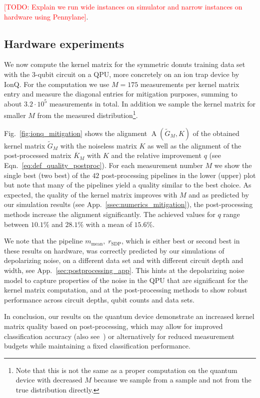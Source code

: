 \documentclass[twocolumn,superscriptaddress,nofootinbib]{revtex4-2}
\newcommand{\todo}[1]{\textcolor{red}{[TODO: #1]}}
\begin{document}
    \todo{Explain we run wide instances on simulator and narrow instances on hardware using Pennylane}.

\subsection{Hardware experiments}\label{ssec:numerics_hardware}

We now compute the kernel matrix for the symmetric donuts training data set with the $3$-qubit circuit on a QPU, more concretely on an ion trap device by IonQ.
For the computation we use $M=175$ measurements per kernel matrix entry and measure the diagonal entries for mitigation purposes, summing to about $3.2\cdot 10^{5}$ measurements in total. 
In addition we sample the kernel matrix for smaller $M$ from the measured distribution\footnote{Note that this is not the same as a proper computation on the quantum device with decreased $M$ because we sample from a sample and not from the true distribution directly.}.

Fig.~\ref{fig:ionq_mitigation} shows the alignment $\operatorname{A}(\tilde{G}_M, K)$ of the obtained kernel matrix $\tilde{G}_M$ with the noiseless matrix $K$ as well as the alignment of the post-processed matrix $\overline{K}_M$ with $K$ and the relative improvement $q$ (see Eqn.~\eqref{eq:def_quality_postproc}).
For each measurement number $M$ we show the single best (two best) of the $42$ post-processing pipelines in the lower (upper) plot but note that many of the pipelines yield a quality similar to the best choice.
As expected, the quality of the kernel matrix improves with $M$ and as predicted by our simulation results (see App.~\ref{ssec:numerics_mitigation}), the post-processing methods increase the alignment significantly.
The achieved values for $q$ range between $10.1\%$ and $28.1\%$ with a mean of $15.6\%$.

We note that the pipeline $m_\mathrm{mean},\;r_\mathrm{SDP}$, which is either best or second best in these results on hardware, was correctly predicted by our simulations of depolarizing noise, on a different data set and with different circuit depth and width, see App.~\ref{sec:postprocessing_app}.
This hints at the depolarizing noise model to capture properties of the noise in the QPU that are significant for the kernel matrix computation, and at the post-processing methods to show robust performance across circuit depths, qubit counts and data sets.

In conclusion, our results on the quantum device demonstrate an increased kernel matrix quality based on post-processing, which may allow for improved classification accuracy (also see~\cite{wang2021UnderstandingQEKPower}) or alternatively for reduced measurement budgets while maintaining a fixed classification performance.
\end{document}
